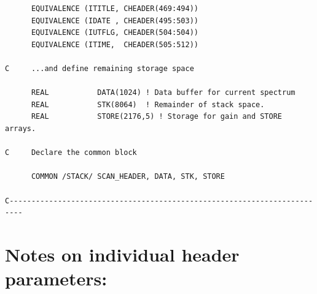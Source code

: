 \documentclass[11pt,twoside]{report}
\begin{document}
\begin{verbatim}
      EQUIVALENCE (ITITLE, CHEADER(469:494))
      EQUIVALENCE (IDATE , CHEADER(495:503))
      EQUIVALENCE (IUTFLG, CHEADER(504:504))
      EQUIVALENCE (ITIME,  CHEADER(505:512))

C     ...and define remaining storage space

      REAL           DATA(1024) ! Data buffer for current spectrum
      REAL           STK(8064)  ! Remainder of stack space.
      REAL           STORE(2176,5) ! Storage for gain and STORE arrays.

C     Declare the common block

      COMMON /STACK/ SCAN_HEADER, DATA, STK, STORE

C-------------------------------------------------------------------------
\end{verbatim}

\section{Notes on individual header parameters:}
\end{document}
